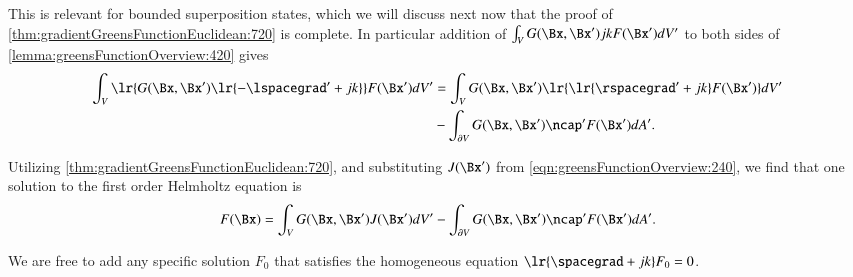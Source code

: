 This is relevant for bounded superposition states, which we will discuss next now that the proof of
\cref{thm:gradientGreensFunctionEuclidean:720} is complete.
In particular addition of
\( \int_V G(\Bx, \Bx') j k F(\Bx') dV' \) to both sides of \cref{lemma:greensFunctionOverview:420} gives
\begin{dmath}\label{eqn:greensFunctionFirstOrderHelmholtz:860}
\begin{aligned}
\int_V \lr{ G(\Bx, \Bx') \lr{ -\lspacegrad' + j k } } F(\Bx') dV'
&=
\int_V G(\Bx, \Bx') \lr{ \lr{ \rspacegrad' + j k } F(\Bx') } dV' \\
&-
\int_{\partial V} G(\Bx, \Bx') \ncap' F(\Bx') dA'.
\end{aligned}
\end{dmath}

Utilizing \cref{thm:gradientGreensFunctionEuclidean:720}, and substituting \( J(\Bx') \)
from \cref{eqn:greensFunctionOverview:240},
we find that one solution to the first order Helmholtz equation is
\begin{dmath}\label{eqn:greensFunctionFirstOrderHelmholtz:880}
F(\Bx)
=
\int_V G(\Bx, \Bx') J(\Bx') dV'
-
\int_{\partial V} G(\Bx, \Bx') \ncap' F(\Bx') dA'.
\end{dmath}

We are free to
add any specific solution \( F_0 \) that satisfies the homogeneous equation \( \lr{ \spacegrad + j k } F_0 = 0 \).
